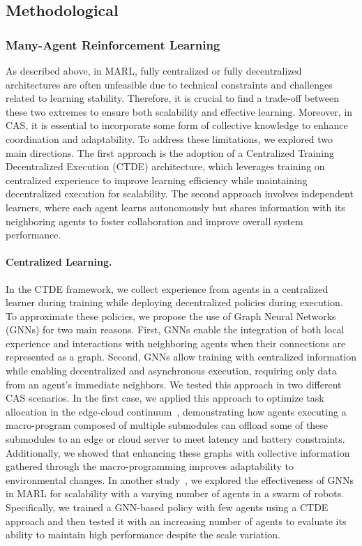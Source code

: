 \documentclass[12pt]{article}
\begin{document}
\subsection{Methodological}

\subsubsection{Many-Agent Reinforcement Learning}

As described above, in MARL, fully centralized or fully decentralized architectures are often 
 unfeasible due to technical constraints and challenges related to learning stability. 
% 
Therefore, it is crucial to find a trade-off between these two extremes to ensure both scalability and 
 effective learning. 
% 
Moreover, in CAS, it is essential to incorporate some form of collective knowledge to enhance 
 coordination and adaptability.
% 
To address these limitations, we explored two main directions. 
%
The first approach is the adoption of a Centralized Training Decentralized Execution (CTDE) architecture, 
 which leverages training on centralized experience to improve learning efficiency while maintaining 
 decentralized execution for scalability. 
% 
The second approach involves independent learners, where each agent learns autonomously but shares information with 
 its neighboring agents to foster collaboration and improve overall system performance.

\paragraph{Centralized Learning.}
In the CTDE framework, we collect experience from agents in a centralized 
 learner during training while deploying decentralized policies during execution. 
% 
To approximate these policies, we propose the use of Graph Neural Networks (GNNs) for two main reasons. 
%
First, GNNs enable the integration of both local experience and interactions with neighboring agents 
 when their connections are represented as a graph. 
% 
Second, GNNs allow training with centralized information while enabling decentralized and asynchronous execution, 
 requiring only data from an agent's immediate neighbors. 
% 
We tested this approach in two different CAS scenarios. 
%
In the first case, we applied this approach to optimize task allocation in the 
 edge-cloud continuum~\cite{DBLP:journals/taas/FarabegoliDAV2025,DBLP:conf/woa/DominiFAV24}, 
 demonstrating how agents executing a macro-program composed of multiple submodules can offload some of these submodules 
 to an edge or cloud server to meet latency and battery constraints. 
%
Additionally, we showed that enhancing these graphs with collective information gathered through the macro-programming 
 improves adaptability to environmental changes. 
% 
In another study~\cite{DBLP:conf/coordination/VenturiniDAV2025}, we explored the effectiveness of GNNs in MARL for 
 scalability with a varying number of agents in a swarm of robots. 
% 
Specifically, we trained a GNN-based policy with few agents using a CTDE approach and then tested it 
 with an increasing number of agents to evaluate its ability to maintain high performance despite the scale variation.
\end{document}
